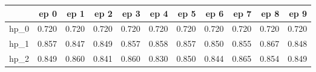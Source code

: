 \begin{tabular}{lrrrrrrrrrr}
\toprule
{} &   ep 0 &   ep 1 &   ep 2 &   ep 3 &   ep 4 &   ep 5 &   ep 6 &   ep 7 &   ep 8 &   ep 9 \\
\midrule
hp\_0 &  0.720 &  0.720 &  0.720 &  0.720 &  0.720 &  0.720 &  0.720 &  0.720 &  0.720 &  0.720 \\
hp\_1 &  0.857 &  0.847 &  0.849 &  0.857 &  0.858 &  0.857 &  0.850 &  0.855 &  0.867 &  0.848 \\
hp\_2 &  0.849 &  0.860 &  0.841 &  0.860 &  0.830 &  0.850 &  0.844 &  0.865 &  0.854 &  0.849 \\
\bottomrule
\end{tabular}
